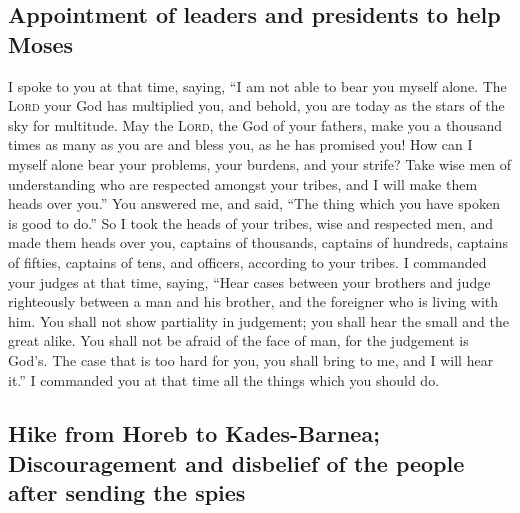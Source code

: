 \hypertarget{appointment-of-leaders-and-presidents-to-help-moses}{%
\subsection{Appointment of leaders and presidents to help
Moses}\label{appointment-of-leaders-and-presidents-to-help-moses}}

 I spoke to you at that time, saying, ``I am not able to
bear you myself alone.  The \textsc{Lord} your God has
multiplied you, and behold, you are today as the stars of the sky for
multitude.  May the \textsc{Lord}, the God of your
fathers, make you a thousand times as many as you are and bless you, as
he has promised you!  How can I myself alone bear your
problems, your burdens, and your strife?  Take wise men
of understanding who are respected amongst your tribes, and I will make
them heads over you.''  You answered me, and said, ``The
thing which you have spoken is good to do.''  So I took
the heads of your tribes, wise and respected men, and made them heads
over you, captains of thousands, captains of hundreds, captains of
fifties, captains of tens, and officers, according to your tribes.
 I commanded your judges at that time, saying, ``Hear
cases between your brothers and judge righteously between a man and his
brother, and the foreigner who is living with him.  You
shall not show partiality in judgement; you shall hear the small and the
great alike. You shall not be afraid of the face of man, for the
judgement is God's. The case that is too hard for you, you shall bring
to me, and I will hear it.''  I commanded you at that
time all the things which you should do.

\hypertarget{hike-from-horeb-to-kades-barnea-discouragement-and-disbelief-of-the-people-after-sending-the-spies}{%
\subsection{Hike from Horeb to Kades-Barnea; Discouragement and
disbelief of the people after sending the
spies}\label{hike-from-horeb-to-kades-barnea-discouragement-and-disbelief-of-the-people-after-sending-the-spies}}

